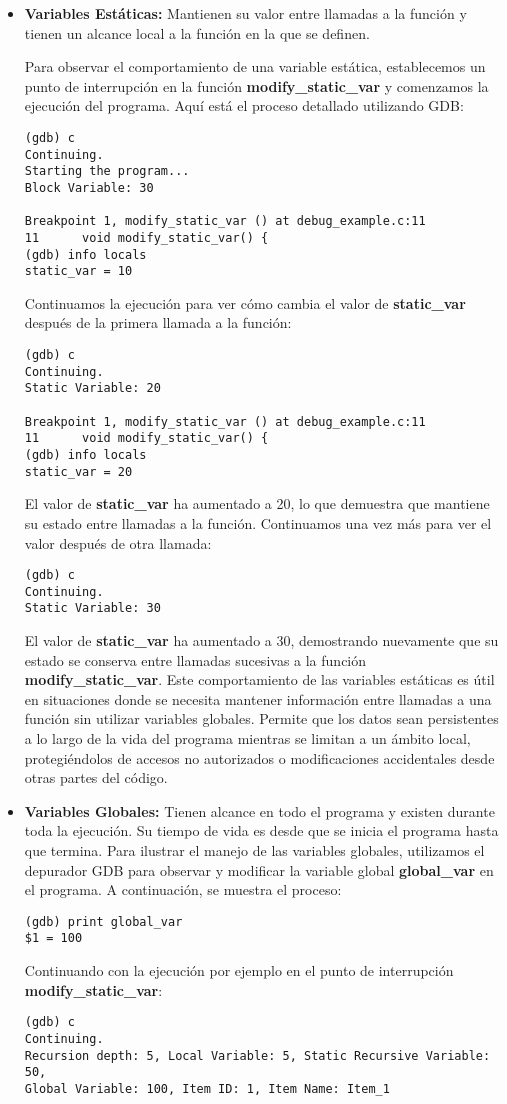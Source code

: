\documentclass[12pt,a4paper]{article}
\begin{document}
\begin{itemize}
\item \textbf{Variables Estáticas:} Mantienen su valor entre llamadas a la función y tienen un alcance local a la función en la que se definen.

Para observar el comportamiento de una variable estática, establecemos un punto de interrupción en la función \textbf{modify\_static\_var} y comenzamos la ejecución del programa. Aquí está el proceso detallado utilizando GDB:
\begin{verbatim}
(gdb) c
Continuing.
Starting the program...
Block Variable: 30

Breakpoint 1, modify_static_var () at debug_example.c:11
11      void modify_static_var() {
(gdb) info locals
static_var = 10	
\end{verbatim}

Continuamos la ejecución para ver cómo cambia el valor de \textbf{static\_var} después de la primera llamada a la función:
\begin{verbatim}
(gdb) c
Continuing.
Static Variable: 20

Breakpoint 1, modify_static_var () at debug_example.c:11
11      void modify_static_var() {
(gdb) info locals
static_var = 20	
\end{verbatim}
El valor de \textbf{static\_var} ha aumentado a 20, lo que demuestra que mantiene su estado entre llamadas a la función. Continuamos una vez más para ver el valor después de otra llamada:
\begin{verbatim}
(gdb) c
Continuing.
Static Variable: 30	
\end{verbatim}
El valor de \textbf{static\_var} ha aumentado a 30, demostrando nuevamente que su estado se conserva entre llamadas sucesivas a la función \textbf{modify\_static\_var}.
Este comportamiento de las variables estáticas es útil en situaciones donde se necesita mantener información entre llamadas a una función sin utilizar variables globales. Permite que los datos sean persistentes a lo largo de la vida del programa mientras se limitan a un ámbito local, protegiéndolos de accesos no autorizados o modificaciones accidentales desde otras partes del código.

\item \textbf{Variables Globales:} Tienen alcance en todo el programa y existen durante toda la ejecución. Su tiempo de vida es desde que se inicia el programa hasta que termina.
Para ilustrar el manejo de las variables globales, utilizamos el depurador GDB para observar y modificar la variable global \textbf{global\_var} en el programa. A continuación, se muestra el proceso:
\begin{verbatim}
(gdb) print global_var
$1 = 100
\end{verbatim}
Continuando con la ejecución por ejemplo en el punto de interrupción \textbf{modify\_static\_var}:
\begin{verbatim}
(gdb) c
Continuing.
Recursion depth: 5, Local Variable: 5, Static Recursive Variable: 50, 
Global Variable: 100, Item ID: 1, Item Name: Item_1


\end{verbatim}
\end{itemize}
\end{document}

